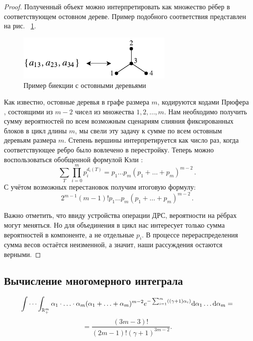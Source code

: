 \begin{proof}
Полученный объект можно интерпретировать как множество рёбер в соответствующем остовном дереве. Пример подобного соответствия представлен на рис. ~\ref{tree-bijection}.
\begin{figure}[h!]
    \includegraphics[width=3in]{img/tree-bijection.pdf}
    \caption{Пример биекции с остовными деревьями}
    \label{tree-bijection}
\end{figure}

Как известно, остовные деревья в графе размера $m$, кодируются кодами Прюфера \cite{prufer}, состоящими из $m-2$ чисел из множества ${1,2,\ldots,m}$. 
Нам необходимо получить сумму вероятностей по всем возможным сценариям слияния фиксированных блоков в цикл длины $m$, мы свели эту задачу к сумме по всем остовным деревьям размера $m$.
Степень вершины интерпретируется как число раз, когда соответствующее ребро было вовлечено в перестройку.
Теперь можно воспользоваться обобщенной формулой Кэли \cite{cayley}:
$$ \sum_T \prod_{i=0}^m p_i^{d_i(T)} 
= p_1 \ldots p_m (p_1 + \ldots + p_m) ^ {m - 2} \, . $$
С учётом возможных перестановок получим итоговую формулу:
$$2 ^ {m - 1} (m - 1)! p_1 \ldots p_m (p_1 + \ldots + p_m) ^ {m - 2} \, .$$

Важно отметить, что ввиду устройства операции ДРС, вероятности на рёбрах могут меняться.
Но для объединения в цикл нас интересует только сумма вероятностей в компоненте, а не отдельные $p_i$.
В процессе перераспределения сумма весов остаётся неизменной, а значит, наши рассуждения остаются верными.
\end{proof}

\subsection{Вычисление многомерного интеграла}
\begin{lemma}
$$
    \idotsint_{ \mathbb{R}^m_+} {
        \alpha_1 \cdot \ldots \cdot \alpha_m
        (\alpha_1 + \ldots + \alpha_m) ^ {m - 2}
        e ^ { -\sum_{i=1}^{m} ((\gamma + 1) \alpha_i)}
        \mathrm{d} \alpha_1 \ldots \mathrm{d} \alpha_m
    } = $$ $$ =  \frac
    {(3 m - 3)!}
    {(2 m - 1)! (\gamma + 1) ^ {3 m - 2}}
    \label{l-int}.
$$
\end{lemma}

